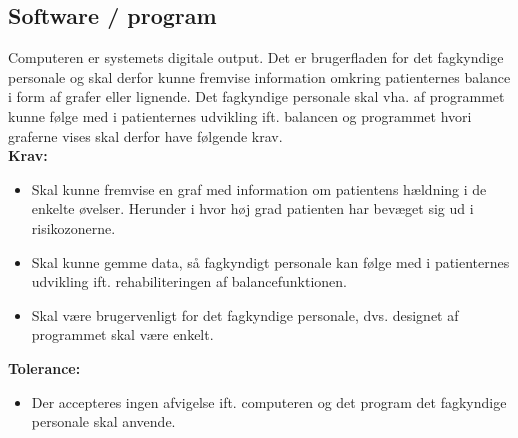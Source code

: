 \subsection{Software / program}
Computeren er systemets digitale output. Det er brugerfladen for det fagkyndige personale og skal derfor kunne fremvise information omkring patienternes balance i form af grafer eller lignende. Det fagkyndige personale skal vha. af programmet kunne følge med i patienternes udvikling ift. balancen og programmet hvori graferne vises skal derfor have følgende krav. \\
\textbf{Krav:}
\begin{itemize}
\item Skal kunne fremvise en graf med information om patientens hældning i de enkelte øvelser. Herunder i hvor høj grad patienten har bevæget sig ud i risikozonerne. 
\item Skal kunne gemme data, så fagkyndigt personale kan følge med i patienternes udvikling ift. rehabiliteringen af balancefunktionen.
\item Skal være brugervenligt for det fagkyndige personale, dvs. designet af programmet skal være enkelt. 
\end{itemize}
\textbf{Tolerance:}
\begin{itemize}
\item Der accepteres ingen afvigelse ift. computeren og det program det fagkyndige personale skal anvende. 
\end{itemize}




